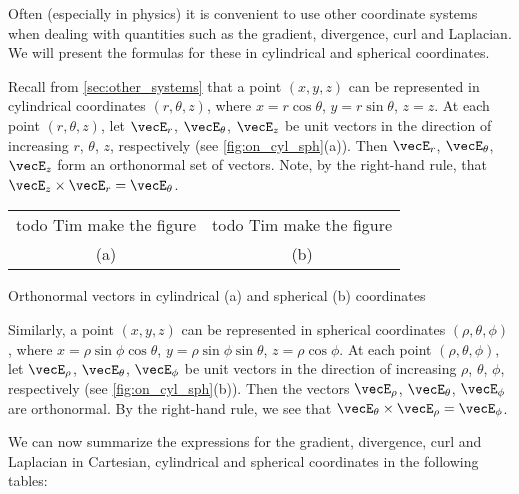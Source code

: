 Often (especially in physics) it is convenient to use other coordinate systems when dealing with quantities such as the gradient, divergence, curl and Laplacian. We will present the formulas for these in cylindrical and spherical coordinates.

Recall from \autoref{sec:other_systems} that a point $(x,y,z)$ can be represented in cylindrical coordinates $(r, \theta , z)$, where $x=r\cos \theta$, $y=r\sin \theta$, $z=z$. At each point $(r, \theta , z)$, let $\vecE_{r}$, $\vecE_{\theta}$, $\vecE_{z}$ be unit vectors in the direction of increasing $r$, $\theta$, $z$, respectively (see \autoref{fig:on_cyl_sph}(a)). Then $\vecE_{r}$, $\vecE_{\theta}$, $\vecE_{z}$ form an orthonormal set of vectors. Note, by the right-hand rule, that $\vecE_{z}\times\vecE_{r}=\vecE_{\theta}$.

\begin{lxfigure}
 \begin{center}
 \begin{tabular}{cc}
  todo Tim make the figure &
  todo Tim make the figure
  \\
  (a)
  &
  (b)
  \end{tabular}
  \caption{Orthonormal vectors in cylindrical (a) and spherical (b) coordinates}
  \label{fig:on_cyl_sph}
  \end{center}
\end{lxfigure}

Similarly, a point $(x,y,z)$ can be represented in spherical coordinates $(\rho, \theta , \phi)$, where $x=\rho\sin \phi \cos \theta$, $y=\rho\sin \phi \sin \theta$, $z=\rho\cos \phi$. At each point $(\rho, \theta , \phi)$, let $\vecE_{\rho}$, $\vecE_{\theta}$, $\vecE_{\phi}$ be unit vectors in the direction of increasing $\rho$, $\theta$, $\phi$, respectively (see \autoref{fig:on_cyl_sph}(b)). Then the vectors $\vecE_{\rho}$, $\vecE_{\theta}$, $\vecE_{\phi}$ are orthonormal. By the right-hand rule, we see that $\vecE_{\theta}\times\vecE_{\rho}=\vecE_{\phi}$.

We can now summarize the expressions for the gradient, divergence, curl and Laplacian in Cartesian, cylindrical and spherical coordinates in the following tables:

